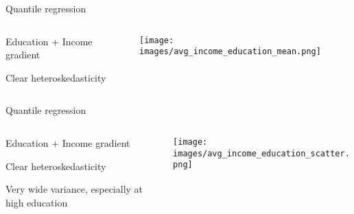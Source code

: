 \documentclass[notes,11pt, aspectratio=169]{beamer}
\newenvironment{wideitemize}{\itemize\addtolength{\itemsep}{10pt}}{\enditemize}
\begin{document}
\begin{frame}{Quantile regression}
  \begin{columns}[T] %
\begin{column}{.3\textwidth}
  \begin{wideitemize}
    \item Education + Income  gradient
  \item Clear heteroskedasticity
    \end{wideitemize}
  \end{column}%
  \hfill%
  \begin{column}{.7\textwidth}
    \texttt{[image: images/avg\_income\_education\_mean.png]}
  \end{column}
\end{columns}
\end{frame}

\begin{frame}{Quantile regression}
  \begin{columns}[T] %
    \begin{column}{.3\textwidth}
  \begin{wideitemize}
    \item Education + Income  gradient
    \item Clear heteroskedasticity
    \item Very wide variance, especially at high education
  \end{wideitemize}
  \end{column}%
  \hfill%
  \begin{column}{.7\textwidth}
    \texttt{[image: images/avg\_income\_education\_scatter.png]}
  \end{column}
\end{columns}
\end{frame}
\end{document}
